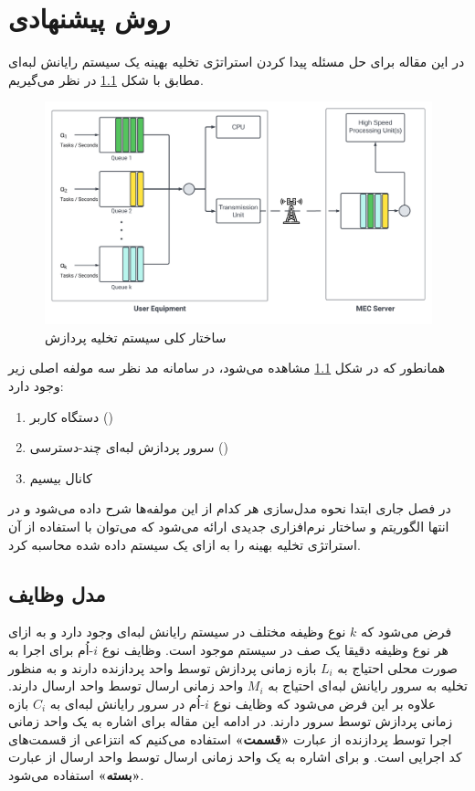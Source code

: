 \chapter{روش پیشنهادی}
در این مقاله برای حل مسئله پیدا کردن استراتژی تخلیه بهینه یک سیستم رایانش لبه‌ای مطابق با شکل \ref{fig-offloading-system} در نظر می‌گیریم.
\begin{figure}[H]
	\centering
	\includegraphics*[width=\textwidth]{figures/MEC5.png}
	\caption{ساختار کلی سیستم تخلیه پردازش}
	\label{fig-offloading-system}
\end{figure}
\newpage
همانطور که در شکل \ref{fig-offloading-system} مشاهده می‌شود، در سامانه مد نظر سه مولفه اصلی زیر وجود دارد:
\begin{enumerate}
	\item دستگاه کاربر ()
	\item سرور پردازش لبه‌ای چند-دسترسی ()
	\item کانال بیسیم
\end{enumerate}
در فصل جاری ابتدا نحوه مدل‌سازی هر کدام از این مولفه‌ها شرح داده می‌شود و در انتها الگوریتم و ساختار نرم‌افزاری جدیدی ارائه می‌شود که می‌توان با استفاده از آن استراتژی تخلیه بهینه را به ازای یک سیستم داده شده محاسبه کرد.
\section{مدل وظایف}
فرض می‌شود که \(k\) نوع وظیفه مختلف در سیستم رایانش لبه‌ای وجود دارد و به ازای هر نوع وظیفه دقیقا یک صف در سیستم موجود است. وظایف نوع \(i\)-اُم برای اجرا به صورت محلی احتیاج به \(L_i\) بازه زمانی پردازش توسط واحد پردازنده دارند و به منظور تخلیه به سرور رایانش لبه‌ای احتیاج به \(M_i\) واحد زمانی ارسال توسط واحد ارسال دارند. علاوه بر این فرض می‌شود که وظایف نوع \(i\)-اُم در سرور رایانش لبه‌ای به \(C_i\) بازه زمانی پردازش توسط سرور دارند. در ادامه این مقاله برای اشاره به یک واحد زمانی اجرا توسط پردازنده از عبارت \textbf{«قسمت»} استفاده می‌کنیم که انتزاعی از قسمت‌های کد اجرایی است. و برای اشاره به یک واحد زمانی ارسال توسط واحد ارسال از عبارت\textbf{ «بسته» }استفاده می‌شود.
\newpage
